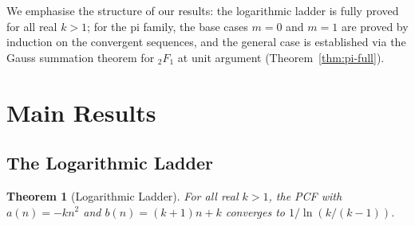 \documentclass[11pt,a4paper]{article}
\theoremstyle{plain}
\newtheorem{theorem}{Theorem}
\theoremstyle{remark}
\begin{document}
We emphasise the structure of our results: the logarithmic ladder
is fully proved for all real $k > 1$; for the pi family,
the base cases $m = 0$ and $m = 1$ are proved by induction on
the convergent sequences, and the general case is established
via the Gauss summation theorem for ${}_2F_1$ at unit argument
(Theorem~\ref{thm:pi-full}).

\section{Main Results}

\subsection{The Logarithmic Ladder}

\begin{theorem}[Logarithmic Ladder]\label{thm:log}
For all real $k > 1$, the PCF with
$a(n) = -kn^2$ and $b(n) = (k{+}1)n + k$
converges to $1/\ln(k/(k{-}1))$.
\end{theorem}
\end{document}
